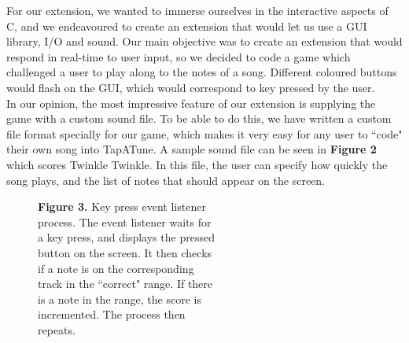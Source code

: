 \documentclass[11pt]{article}
\begin{document}
For our extension, we wanted to immerse ourselves in the interactive aspects of C, and we endeavoured to create an extension that would let us use a GUI library, I/O and sound. Our main objective was to create an extension that would respond in real-time to user input, so we decided to code a game which challenged a user to play along to the notes of a song. Different coloured buttons would flash on the GUI, which would correspond to key pressed by the user.
\\ In our opinion, the most impressive feature of our extension is supplying the game with a custom sound file. To be able to do this, we have written a custom file format specially for our game, which makes it very easy for any user to ``code" their own song into TapATune. A sample sound file can be seen in \textbf{Figure 2} which scores Twinkle Twinkle. In this file, the user can specify how quickly the song plays, and the list of notes that should appear on the screen.

\begin{figure}
  \vspace{-1em}
  \hspace*{4em}
  \raggedright
  
  \setlength{\belowcaptionskip}{-4em}
  \captionsetup{justification=justified,singlelinecheck=false}
  \caption*{\hspace*{1.9em}\fontsize{9}{9}\selectfont \textbf{Figure 3.} Key press event listener \\\hspace*{2.2em}process. The event listener waits for \\\hspace*{2.2em}a key press, and displays the pressed \\\hspace*{2.2em}button on the screen. It then checks\\\hspace*{2.2em}if a note is on the corresponding\\\hspace*{2.2em}track in the ``correct" range. If there\\\hspace*{2.2em}is a note in the range, the score is \\\hspace*{2.2em}incremented. The process then\\\hspace*{2.2em}repeats.}
\end{figure}
\end{document}
